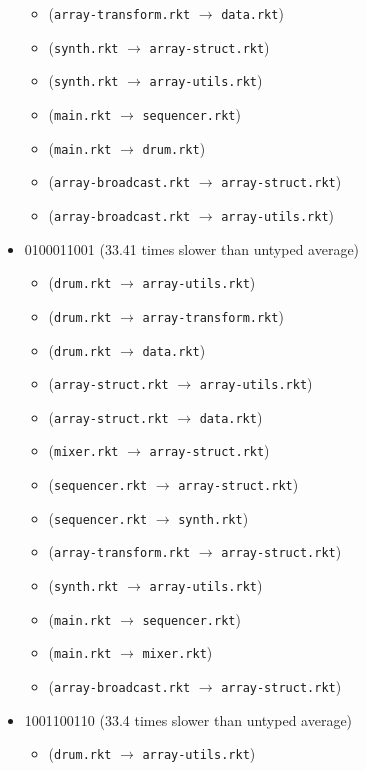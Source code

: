 \documentclass{article}
\newcommand{\mono}[1]{\texttt{#1}}
\begin{document}
\begin{itemize}
\begin{itemize}
  \item (\mono{array-transform.rkt} $\rightarrow$ \mono{data.rkt})
  \item (\mono{synth.rkt} $\rightarrow$ \mono{array-struct.rkt})
  \item (\mono{synth.rkt} $\rightarrow$ \mono{array-utils.rkt})
  \item (\mono{main.rkt} $\rightarrow$ \mono{sequencer.rkt})
  \item (\mono{main.rkt} $\rightarrow$ \mono{drum.rkt})
  \item (\mono{array-broadcast.rkt} $\rightarrow$ \mono{array-struct.rkt})
  \item (\mono{array-broadcast.rkt} $\rightarrow$ \mono{array-utils.rkt})
  \end{itemize}
\item 0100011001 (33.41 times slower than untyped average)
  \begin{itemize}
  \item (\mono{drum.rkt} $\rightarrow$ \mono{array-utils.rkt})
  \item (\mono{drum.rkt} $\rightarrow$ \mono{array-transform.rkt})
  \item (\mono{drum.rkt} $\rightarrow$ \mono{data.rkt})
  \item (\mono{array-struct.rkt} $\rightarrow$ \mono{array-utils.rkt})
  \item (\mono{array-struct.rkt} $\rightarrow$ \mono{data.rkt})
  \item (\mono{mixer.rkt} $\rightarrow$ \mono{array-struct.rkt})
  \item (\mono{sequencer.rkt} $\rightarrow$ \mono{array-struct.rkt})
  \item (\mono{sequencer.rkt} $\rightarrow$ \mono{synth.rkt})
  \item (\mono{array-transform.rkt} $\rightarrow$ \mono{array-struct.rkt})
  \item (\mono{synth.rkt} $\rightarrow$ \mono{array-utils.rkt})
  \item (\mono{main.rkt} $\rightarrow$ \mono{sequencer.rkt})
  \item (\mono{main.rkt} $\rightarrow$ \mono{mixer.rkt})
  \item (\mono{array-broadcast.rkt} $\rightarrow$ \mono{array-struct.rkt})
  \end{itemize}
\item 1001100110 (33.4 times slower than untyped average)
  \begin{itemize}
  \item (\mono{drum.rkt} $\rightarrow$ \mono{array-utils.rkt})

\end{itemize}
\end{itemize}
\end{document}
